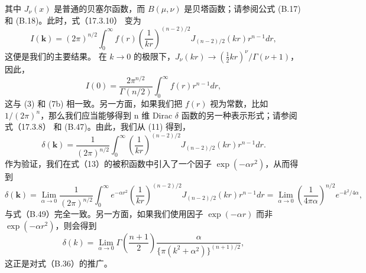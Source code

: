 其中 \(J_{\nu}(x)\) 是普通的贝塞尔函数，而 \(B(\mu,\nu)\) 是贝塔函数；请参阅公式 (B.17) 和 (B.18)。此时，式（17.3.10） 变为
\begin{equation}\tag{17.3.13}\label{eq:17.3.13}
I ( \pmb { k } ) = ( 2 \pi ) ^{n / 2} \int _ { 0 } ^{\infty} f ( r ) \left( \frac { 1 } { k r } \right) ^{( n - 2 ) / 2} J _ { ( n - 2 ) / 2 } ( k r ) r ^{n - 1} d r ,
\end{equation}
这便是我们的主要结果。
在 \(k \to 0\) 的极限下，\(J_{\nu}(kr) \to \left(\frac{1}{2}kr\right)^{\nu}/\Gamma(\nu+1)\)，因此，
\begin{equation}\tag{17.3.14}\label{eq:17.3.14}
I ( 0 ) = \frac { 2 \pi ^{n / 2} } { \Gamma ( n / 2 ) } \int _ { 0 } ^{\infty} f ( r ) r ^{n - 1} d r ,
\end{equation}
这与 (3) 和 (7b) 相一致。另一方面，如果我们把 \(f(r)\) 视为常数，比如 \(1/(2\pi)^n\)，那么我们应当能够得到 n 维 Dirac \(\delta\) 函数的另一种表示形式；请参阅式（17.3.8） 和 (B.47)。由此，我们从 (11) 得到，
\begin{equation}\tag{17.3.15}\label{eq:17.3.15}
\delta ( \pmb { k } ) = \frac { 1 } { ( 2 \pi ) ^{n / 2} } \int _ { 0 } ^{\infty} \left( \frac { 1 } { k r } \right) ^{( n - 2 ) / 2} J _ { ( n - 2 ) / 2 } ( k r ) r ^{n - 1} d r .
\end{equation}
作为验证，我们在式（13）的被积函数中引入了一个因子 \(\exp(-\alpha r^{2})\)，从而得到
\begin{equation}\tag{17.3.16}\label{eq:17.3.16}
\delta ( \pmb { k } ) = \operatorname* { L i m } _ { \alpha \to 0 } \frac { 1 } { ( 2 \pi ) ^{n / 2} } \int _ { 0 } ^{\infty} e ^{- \alpha r ^ { 2} } \left( \frac { 1 } { k r } \right) ^{( n - 2 ) / 2} J _ { ( n - 2 ) / 2 } ( k r ) r ^{n - 1} d r = \operatorname* { L i m } _ { \alpha \to 0 } \left( \frac { 1 } { 4 \pi \alpha } \right) ^{n / 2} e ^{- k ^ { 2} / 4 \alpha } ,
\end{equation}
与式（B.49）完全一致。另一方面，如果我们使用因子 \(\exp(-\alpha r)\) 而非 \(\exp(-\alpha r^2)\)，则会得到
\begin{equation}\tag{17.3.17}\label{eq:17.3.17}
\delta ( k ) = \operatorname* { L i m } _ { \alpha \to 0 } \Gamma \left( \frac { n + 1 } { 2 } \right) \frac { \alpha } { \{ \pi ( k ^{2} + \alpha ^{2} ) \} ^{( n + 1 ) / 2} } ,
\end{equation}
这正是对式（B.36）的推广。
